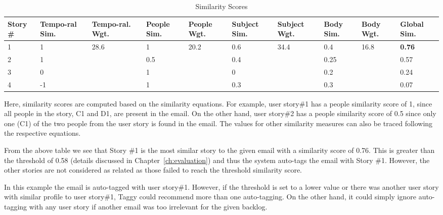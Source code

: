 \begin{table}[h!]
  \centering
  \caption{Similarity Scores}
    \begin{tabular}{|p{1.2cm}|p{1.5cm}|p{1.2cm}|p{1.2cm}|p{1.2cm}|p{1.4cm}|p{1.4cm}|p{1.1cm}|p{1.1cm}|p{1.2cm}|}
      	\hline
		\textbf{Story \#} & \textbf{Tempo-ral Sim.} & \textbf{Tempo-ral. Wgt.} & \textbf{People Sim.} & \textbf{People Wgt.} & \textbf{Subject Sim.} &\textbf{Subject Wgt.} & \textbf{Body Sim.} &\textbf{Body Wgt.} &\textbf{Global Sim.}\\
		\hline
		1 & 1 	& \multirow{4}{*}{28.6} & 1 	& \multirow{4}{*}{20.2}	& 0.6 & \multirow{4}{*}{34.4}	& 0.4 & \multirow{4}{*}{16.8}	& \textbf{0.76}\\
		2 & 1 	&  & 0.5 	&  	& 0.4 	&	& 0.25	&	& 0.57\\
		3 & 0 	&  & 1 		& 	& 0 		& & 0.2	&	& 0.24\\
		4 & -1 	&  & 1 		& 	& 0.3 	& & 0.3	&	& 0.07\\
		\hline
	\end{tabular}
	\label{tab:similarity}
\end{table}  

Here, similarity scores are computed based on the similarity equations. For example, user story\#1 has a people similarity score of 1, since all people in the story, C1 and D1, are present in the email. On the other hand, user story\#2 has a people similarity score of 0.5 since only one (C1) of the two people from the user story is found in the email. The values for other similarity measures can also be traced following the respective equations.

From the above table we see that Story \#1 is the most similar story to the given email with a similarity score of 0.76. This is greater than the threshold of 0.58 (details discussed in Chapter~\ref{ch:evaluation}) and thus the system auto-tags the email with Story \#1. However, the other stories are not considered as related as those failed to reach the threshold similarity score.

In this example the email is auto-tagged with user story\#1. However, if the threshold is set to a lower value or there was another user story with similar profile to user story\#1, Taggy could recommend more than one auto-tagging. On the other hand, it could simply ignore auto-tagging with any user story if another email was too irrelevant for the given backlog.

